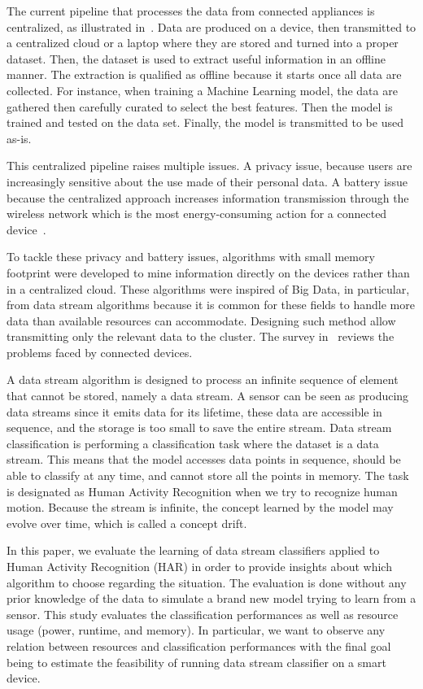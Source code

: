 The current pipeline that processes the data from
connected appliances is centralized, as
illustrated in~\cite{recofit}.  Data are produced
on a device, then transmitted to a centralized
cloud or a laptop where they are stored and turned
into a proper dataset. Then, the dataset is used
to extract useful information in an offline
manner.  The extraction is qualified as offline
because it starts once all data are collected. For
instance, when training a Machine Learning model,
the data are gathered then carefully curated to select
the best features. Then the model is trained and
tested on the data set. Finally, the model is
transmitted to be used as-is.

This centralized pipeline raises multiple issues.
A privacy issue, because users are increasingly
sensitive about the use made of their personal
data.  A battery issue because the centralized
approach increases information transmission through
the wireless network which is the most
energy-consuming action for a connected
device~\cite{sensor-network-survey,
sensor-energy-model}.

To tackle these privacy and battery issues,
algorithms with small memory footprint were
developed to mine information directly on the
devices rather than in a centralized cloud.  These
algorithms were inspired of Big Data, in
particular, from data stream algorithms because it
is common for these fields to handle more data
than available resources can accommodate.
Designing such method allow transmitting only the
relevant data to the cluster. The survey
in~\cite{kejariwal2015} reviews the problems faced
by connected devices.

A data stream algorithm is designed to process an
infinite sequence of element that cannot be
stored, namely a data stream. A sensor can be
seen as producing data streams since it emits data
for its lifetime, these data are accessible in
sequence, and the storage is too small to save the
entire stream. Data stream classification is
performing a classification task where the dataset
is a data stream. This means that the model
accesses data points in sequence, should be able
to classify at any time, and cannot store all the
points in memory. The task is designated as Human Activity
Recognition when we try to recognize human motion.
Because the stream is infinite, the concept
learned by the model may evolve over time, which is
called a concept drift.

In this paper, we evaluate the learning of data
stream classifiers applied to Human Activity
Recognition (HAR) in order to provide insights
about which algorithm to choose regarding the
situation. The evaluation is done without any
prior knowledge of the data to simulate a brand
new model trying to learn from a sensor. This
study evaluates the classification performances as
well as resource usage (power, runtime, and
memory). In particular, we want to observe any
relation between resources and classification
performances with the final goal being to estimate the
feasibility of running data stream classifier
on a smart device.

